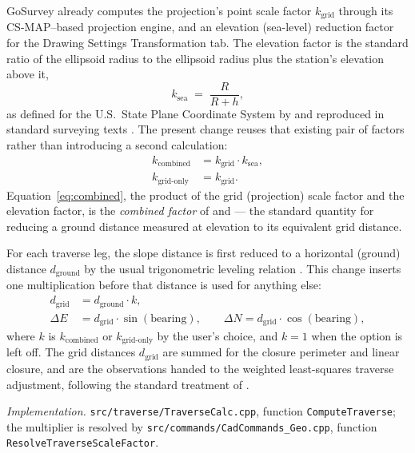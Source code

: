 \documentclass[11pt]{article}
\begin{document}
GoSurvey already computes the projection's point scale factor
$k_{\mathrm{grid}}$ through its CS-MAP--based projection engine, and an
elevation (sea-level) reduction factor for the Drawing Settings
Transformation tab. The elevation factor is the standard ratio of the
ellipsoid radius to the ellipsoid radius plus the station's elevation above
it,
\begin{equation}
k_{\mathrm{sea}} \;=\; \frac{R}{R + h},
\label{eq:sea}
\end{equation}
as defined for the U.S.\ State Plane Coordinate System by
\citet{stem1990} and reproduced in standard surveying texts
\citep{ghilaniwolf2015}. The present change reuses that existing pair of
factors rather than introducing a second calculation:
\begin{align}
k_{\mathrm{combined}} &= k_{\mathrm{grid}} \cdot k_{\mathrm{sea}},
  \label{eq:combined}\\
k_{\mathrm{grid\text{-}only}} &= k_{\mathrm{grid}}.
  \label{eq:gridonly}
\end{align}
Equation~\ref{eq:combined}, the product of the grid (projection) scale
factor and the elevation factor, is the \emph{combined factor} of
\citet{ghilaniwolf2015} and \citet{stem1990} --- the standard quantity for
reducing a ground distance measured at elevation to its equivalent grid
distance.

For each traverse leg, the slope distance is first reduced to a horizontal
(ground) distance $d_{\mathrm{ground}}$ by the usual trigonometric leveling
relation \citep{ghilaniwolf2015}. This change inserts one multiplication
before that distance is used for anything else:
\begin{align}
d_{\mathrm{grid}} &= d_{\mathrm{ground}} \cdot k, \\
\Delta E &= d_{\mathrm{grid}} \cdot \sin(\mathrm{bearing}), \qquad
\Delta N = d_{\mathrm{grid}} \cdot \cos(\mathrm{bearing}),
\end{align}
where $k$ is $k_{\mathrm{combined}}$ or $k_{\mathrm{grid\text{-}only}}$ by
the user's choice, and $k = 1$ when the option is left off. The grid
distances $d_{\mathrm{grid}}$ are summed for the closure perimeter and
linear closure, and are the observations handed to the weighted
least-squares traverse adjustment, following the standard treatment of
\citet{ghilani2017}.

\emph{Implementation.} \texttt{src/traverse/TraverseCalc.cpp}, function
\texttt{ComputeTraverse}; the multiplier is resolved by
\texttt{src/commands/CadCommands\_Geo.cpp}, function
\texttt{ResolveTraverseScaleFactor}.
\end{document}
